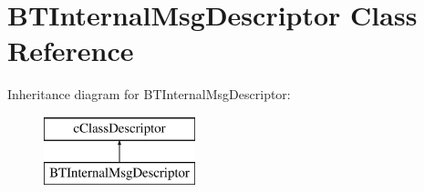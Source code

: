 \hypertarget{classBTInternalMsgDescriptor}{}\section{B\+T\+Internal\+Msg\+Descriptor Class Reference}
\label{classBTInternalMsgDescriptor}
Inheritance diagram for B\+T\+Internal\+Msg\+Descriptor\+:\begin{figure}[H]
\begin{center}
\leavevmode
\includegraphics[height=2.000000cm]{classBTInternalMsgDescriptor}
\end{center}
\end{figure}
